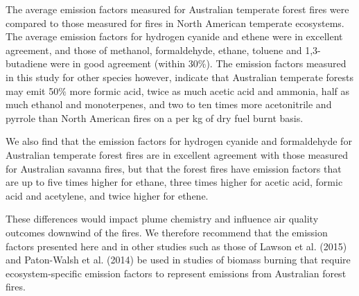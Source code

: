 \documentclass[acp, manuscript]{copernicus}
\begin{document}
The average emission factors measured for Australian temperate forest fires were compared to those measured for fires in North American temperate ecosystems. The average emission factors for hydrogen cyanide and ethene were in excellent agreement, and those of methanol, formaldehyde, ethane, toluene and 1,3-butadiene were in good agreement (within 30$\%$). The emission factors measured in this study for other species however, indicate that Australian temperate forests may emit 50$\%$ more formic acid, twice as much acetic acid and ammonia, half as much ethanol and monoterpenes, and two to ten times more acetonitrile and pyrrole than North American fires on a per kg of dry fuel burnt basis.
 
We also find that the emission factors for hydrogen cyanide and formaldehyde for Australian temperate forest fires are in excellent agreement with those measured for Australian savanna fires, but that the forest fires have emission factors that are up to five times higher for ethane, three times higher for acetic acid, formic acid and acetylene, and twice higher for ethene. 

These differences would impact plume chemistry and influence air quality outcomes downwind of the fires. We therefore recommend that the emission factors presented here and in other studies such as those of Lawson et al. (2015) and Paton-Walsh et al. (2014) be used in studies of biomass burning that require ecosystem-specific emission factors to represent emissions from Australian forest fires.  








\end{document}
